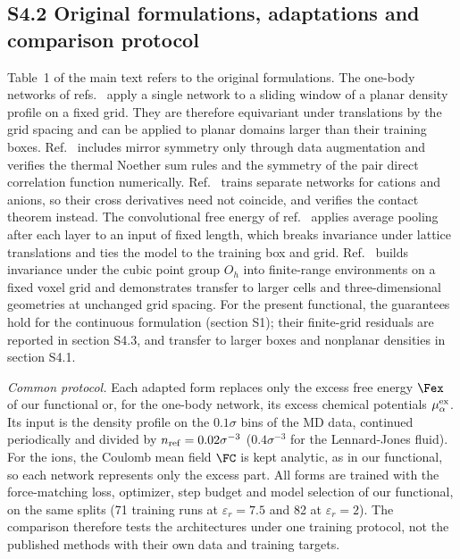 \subsection*{S4.2 Original formulations, adaptations and comparison protocol}
Table~1 of the main text refers to the original formulations. The one-body networks of refs.~\cite{sammuller2023neural,bui2025learning} apply a single network to a sliding window of a planar density profile on a fixed grid. They are therefore equivariant under translations by the grid spacing and can be applied to planar domains larger than their training boxes. Ref.~\cite{sammuller2023neural} includes mirror symmetry only through data augmentation and verifies the thermal Noether sum rules and the symmetry of the pair direct correlation function numerically. Ref.~\cite{bui2025learning} trains separate networks for cations and anions, so their cross derivatives need not coincide, and verifies the contact theorem instead. The convolutional free energy of ref.~\cite{dijkman2025learning} applies average pooling after each layer to an input of fixed length, which breaks invariance under lattice translations and ties the model to the training box and grid. Ref.~\cite{cheng2026equivariant} builds invariance under the cubic point group $O_h$ into finite-range environments on a fixed voxel grid and demonstrates transfer to larger cells and three-dimensional geometries at unchanged grid spacing. For the present functional, the guarantees hold for the continuous formulation (section S1); their finite-grid residuals are reported in section S4.3, and transfer to larger boxes and nonplanar densities in section S4.1.

\textit{Common protocol.} Each adapted form replaces only the excess free energy $\Fex$ of our functional or, for the one-body network, its excess chemical potentials $\mu^{\rm ex}_\alpha$. Its input is the density profile on the $0.1\sigma$ bins of the MD data, continued periodically and divided by $n_{\rm ref}=0.02\sigma^{-3}$ ($0.4\sigma^{-3}$ for the Lennard-Jones fluid). For the ions, the Coulomb mean field $\FC$ is kept analytic, as in our functional, so each network represents only the excess part. All forms are trained with the force-matching loss, optimizer, step budget and model selection of our functional, on the same splits (71 training runs at $\varepsilon_r=7.5$ and 82 at $\varepsilon_r=2$). The comparison therefore tests the architectures under one training protocol, not the published methods with their own data and training targets.

